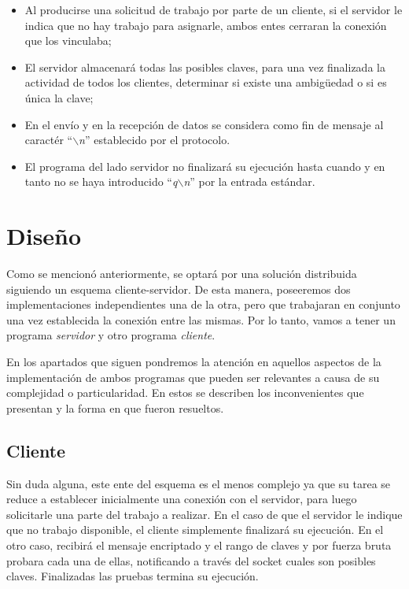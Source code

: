 \documentclass{article}
\begin{document}
\begin{itemize}
	\itemsep=3pt \topsep=0pt \partopsep=0pt \parskip=0pt \parsep=0pt

	\item Al producirse una solicitud de trabajo por parte de un cliente, si el servidor le indica que no hay trabajo para asignarle, ambos entes cerraran la conexión que los vinculaba;

	\item El servidor almacenará todas las posibles claves, para una vez finalizada la actividad de todos los clientes, determinar si existe una ambig\"uedad o si es única la clave;

	\item En el envío y en la recepción de datos se considera como fin de mensaje al caractér ``\textit{$\backslash$n}'' establecido por el protocolo.

	\item El programa del lado servidor no finalizará su ejecución hasta cuando y en tanto no se haya introducido ``\textit{q$\backslash$n}'' por la entrada estándar.
\end{itemize}
\medskip




\section{Diseño}

	Como se mencionó anteriormente, se optará por una solución distribuida siguiendo un esquema cliente-servidor. De esta manera, poseeremos dos implementaciones independientes una de la otra, pero que trabajaran en conjunto una vez establecida la conexión entre las mismas. Por lo tanto, vamos a tener un programa \textit{servidor} y otro programa \textit{cliente}.
	\par
	En los apartados que siguen pondremos la atención en aquellos aspectos de la implementación de ambos programas que pueden ser relevantes a causa de su complejidad o particularidad. En estos se describen los inconvenientes que presentan y la forma en que fueron resueltos.
\bigskip



\subsection{Cliente}
	
	Sin duda alguna, este ente del esquema es el menos complejo ya que su tarea se reduce a establecer inicialmente una conexión con el servidor, para luego solicitarle una parte del trabajo a realizar. En el caso de que el servidor le indique que no trabajo disponible, el cliente simplemente finalizará su ejecución. En el otro caso, recibirá el mensaje encriptado y el rango de claves y por fuerza bruta probara cada una de ellas, notificando a través del socket cuales son posibles claves. Finalizadas las pruebas termina su ejecución.
	\bigskip	
\end{document}
